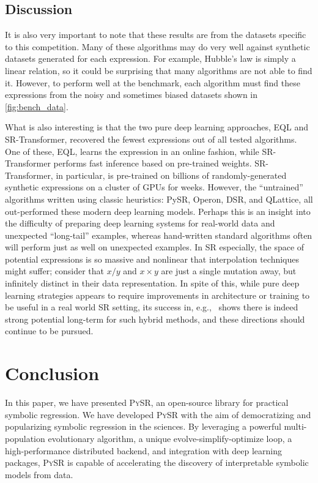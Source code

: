 \documentclass[letterpaper,twocolumn]{scrartcl}
\newcommand\We{We\xspace}
\newcommand\pysr{\textsc{PySR}\xspace}
\newcommand\sr{SR\xspace}
\begin{document}
\subsection{Discussion}

It is also very important to note that these results are from the datasets specific to this competition.
Many of these algorithms may do very well against synthetic datasets generated for each expression.
For example, Hubble's law is simply a linear relation, so it could be surprising that many algorithms are not able to find it.
However, to perform well at the benchmark, each algorithm must find these expressions from the noisy and sometimes biased datasets shown in \cref{fig:bench_data}.



What is also interesting is that the two pure deep learning approaches, EQL and SR-Transformer, recovered the fewest expressions out of all tested algorithms.
One of these, EQL, learns the expression in an online fashion, while SR-Transformer performs fast inference based on pre-trained weights.
SR-Transformer, in particular, is pre-trained on billions of randomly-generated synthetic expressions on a cluster of GPUs for weeks.
However, the ``untrained'' algorithms written using classic heuristics: PySR, Operon, DSR, and QLattice, all out-performed these modern deep learning models. 
Perhaps this is an insight into the difficulty of preparing deep learning systems for real-world data and unexpected ``long-tail'' examples, whereas hand-written standard algorithms often will perform just as well on unexpected examples.  In \sr especially, the space of potential expressions is so massive and nonlinear that interpolation techniques might suffer; consider that $x/y$ and $x\times y$ are just a single mutation away, but infinitely distinct in their data representation.
In spite of this, while pure deep learning strategies appears to require improvements in architecture or training to be useful in a real world \sr setting, its success in, e.g.,~\cite{cranmerDiscoveringSymbolicModels2020,petersenDeepSymbolicRegression2021,kamiennyEndtoendSymbolicRegression2022} shows there is indeed strong potential long-term for such hybrid methods, and these directions should continue to be pursued.


\section{Conclusion}

In this paper, we have presented \pysr, an open-source library for practical symbolic regression.
\We have developed \pysr with the aim of democratizing and popularizing symbolic regression in the sciences.
By leveraging a powerful multi-population evolutionary algorithm, a unique evolve-simplify-optimize loop, a high-performance distributed backend, and integration with deep learning packages, \pysr is capable of accelerating the discovery of interpretable symbolic models from data.
\end{document}

